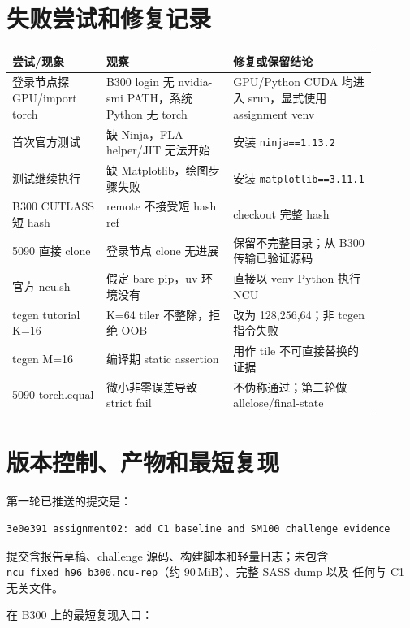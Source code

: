 \documentclass[11pt,a4paper,fontset=none]{ctexart}
\newcommand{\code}[1]{\texttt{#1}}
\begin{document}
\section{失败尝试和修复记录}

\begin{longtable}{@{}L{0.23\linewidth}L{0.31\linewidth}L{0.35\linewidth}@{}}
\toprule
尝试/现象 & 观察 & 修复或保留结论 \\
\midrule
\endhead
\bottomrule
\endlastfoot
登录节点探 GPU/import torch & B300 login 无 nvidia-smi PATH，系统 Python 无 torch & GPU/Python CUDA 均进入 srun，显式使用 assignment venv \\
首次官方测试 & 缺 Ninja，FLA helper/JIT 无法开始 & 安装 \code{ninja==1.13.2} \\
测试继续执行 & 缺 Matplotlib，绘图步骤失败 & 安装 \code{matplotlib==3.11.1} \\
B300 CUTLASS 短 hash & remote 不接受短 hash ref & checkout 完整 hash \\
5090 直接 clone & 登录节点 clone 无进展 & 保留不完整目录；从 B300 传输已验证源码 \\
官方 ncu.sh & 假定 bare pip，uv 环境没有 & 直接以 venv Python 执行 NCU \\
tcgen tutorial K=16 & K=64 tiler 不整除，拒绝 OOB & 改为 128,256,64；非 tcgen 指令失败 \\
tcgen M=16 & 编译期 static assertion & 用作 tile 不可直接替换的证据 \\
5090 torch.equal & 微小非零误差导致 strict fail & 不伪称通过；第二轮做 allclose/final-state \\
\end{longtable}

\section{版本控制、产物和最短复现}

第一轮已推送的提交是：

\begin{lstlisting}
3e0e391 assignment02: add C1 baseline and SM100 challenge evidence
\end{lstlisting}

提交含报告草稿、challenge 源码、构建脚本和轻量日志；未包含
\code{ncu\_fixed\_h96\_b300.ncu-rep}（约 90\,MiB）、完整 SASS dump 以及
任何与 C1 无关文件。

在 B300 上的最短复现入口：
\end{document}
